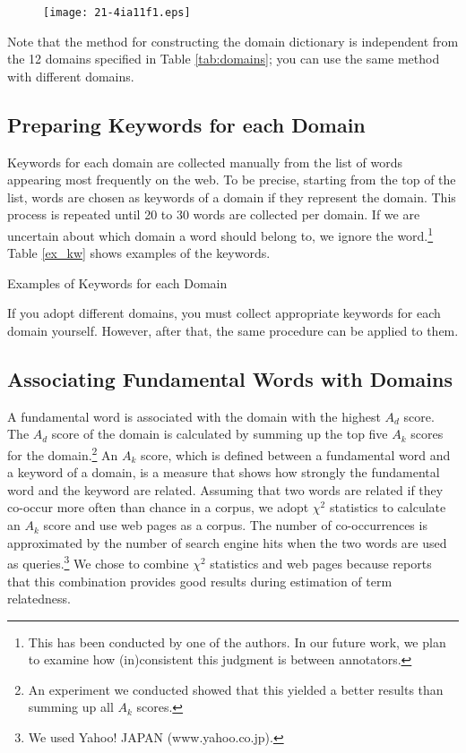 \documentclass[english]{jnlp_1.4_rep}
\begin{document}
\begin{figure}[b]
\begin{center}
\texttt{[image: 21-4ia11f1.eps]}
\end{center}
\label{whole-process}
\end{figure}

Note that the method for constructing the domain dictionary is
independent from the 12 domains specified in Table \ref{tab:domains};
you can use the same method with different domains.


\subsection{Preparing Keywords for each Domain}
\label{prepare_kw}

Keywords for each domain are collected manually from the
list of words appearing most frequently on the web.
To be precise, 
starting from the top of the list,
words are chosen as keywords of a domain if they
represent the domain.
This process is repeated
until 20 to 30 words are collected per domain.
If we are uncertain about which domain a word should belong to,
we ignore the word.\footnote{
This has been conducted by one of the authors.
In our future work, we plan to examine
how (in)consistent this judgment is between annotators.
}
Table \ref{ex_kw} shows examples of the keywords.

\begin{table}[b]
\caption{Examples of Keywords for each Domain}
\label{ex_kw}

\end{table}

If you adopt different domains, you must collect appropriate keywords
for each domain yourself.
However, after that, the same procedure can be applied to them.


\subsection{Associating Fundamental Words with Domains}
\label{associating}

A fundamental word is associated with the domain with the highest $A_d$ score.
The $A_d$ score of the domain is calculated by summing up the top five $A_k$
scores for the domain.\footnote{
An experiment we conducted showed that this yielded a better
results than summing up all $A_k$ scores.}
An $A_k$ score, which is defined between a fundamental word and a keyword of a
domain, is a measure that shows how strongly the fundamental word and the keyword
are related.
Assuming that two words are related if they co-occur more often
than chance in a corpus, we adopt $\chi^2$ statistics to calculate
an $A_k$ score and use web pages as a corpus.
The number of co-occurrences is approximated by the number of search
engine hits when the two words are used as queries.\footnote{
We used Yahoo! JAPAN (www.yahoo.co.jp).} 
We chose to combine $\chi^2$ statistics and web pages because
 reports that this
combination provides
good results during estimation of term relatedness.
\end{document}
